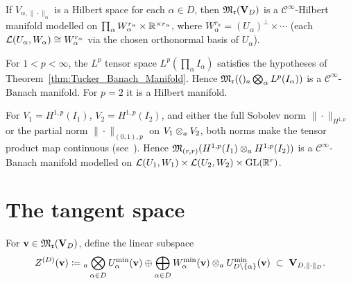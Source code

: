 \begin{corollary}
\label{cor:hilbert_manifold}
If $V_{\alpha,\|\cdot\|_\alpha}$ is a Hilbert space for each
$\alpha \in D$, then $\mathfrak{M}_{\mathfrak{r}}(\mathbf{V}_D)$ is a $\mathcal{C}^\infty$-Hilbert
manifold modelled on
$\prod_\alpha W^{r_\alpha}_\alpha \times \mathbb{R}^{\times r_\alpha}$,
where $W^{r_\alpha}_\alpha = (U_\alpha)^\perp \times \cdots$ (each
$\mathcal{L}(U_\alpha, W_\alpha) \cong W_\alpha^{r_\alpha}$ via the chosen
orthonormal basis of $U_\alpha$).
\end{corollary}

\begin{example}
\label{ex:tucker_mfd_Lp}
For $1 < p < \infty$, the $L^p$ tensor space
$L^p(\prod_\alpha I_\alpha)$ satisfies the hypotheses
of Theorem~\ref{thm:Tucker_Banach_Manifold}. Hence
$\mathfrak{M}_{\mathfrak{r}}((){}_a\bigotimes_\alpha L^p(I_\alpha))$ is a
$\mathcal{C}^\infty$-Banach manifold. For $p=2$ it is a Hilbert
manifold.
\end{example}

\begin{example}
\label{ex:tucker_mfd_Sobolev}
For $V_1 = H^{1,p}(I_1)$, $V_2 = H^{1,p}(I_2)$, and either the
full Sobolev norm $\|\cdot\|_{H^{1,p}}$ or the partial norm
$\|\cdot\|_{(0,1),p}$ on $V_1 \otimes_a V_2$, both norms make the
tensor product map continuous (see~\cite[Examples~4.41,~4.42]{Hackbusch2019}).
Hence $\mathfrak{M}_{(r,r)}(H^{1,p}(I_1) \otimes_a H^{1,p}(I_2))$ is a
$\mathcal{C}^\infty$-Banach manifold modelled on
$\mathcal{L}(U_1, W_1) \times \mathcal{L}(U_2, W_2) \times \mathrm{GL}(\mathbb{R}^r)$.
\end{example}

\section{The tangent space}
\label{sec:tucker_manifold:tangent}

\begin{definition}
\label{def:ZD}
For $\mathbf{v} \in \mathfrak{M}_{\mathfrak{r}}(\mathbf{V}_D)$, define the linear subspace
\begin{equation}
\label{eq:ZD}
    Z^{(D)}(\mathbf{v}) \coloneqq
    {}_a\bigotimes_{\alpha \in D} U^{\min}_{\alpha}(\mathbf{v})
    \oplus
    \bigoplus_{\alpha \in D}
    W^{\min}_{\alpha}(\mathbf{v}) \otimes_a U^{\min}_{D\setminus\{\alpha\}}(\mathbf{v})
    \;\subset\; \mathbf{V}_{D,\|\cdot\|_D}.
\end{equation}
\end{definition}

